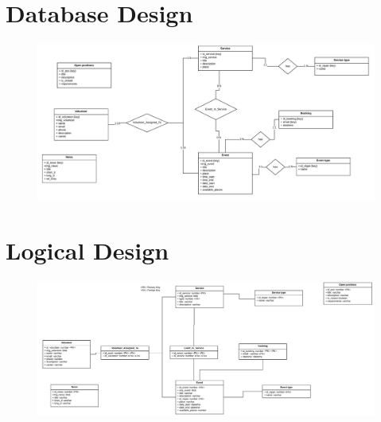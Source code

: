 \section{Database Design}
\begin{figure}[H]
    \centering
    \includegraphics[scale=0.40]{resources/images/db.png}
\end{figure}
\section{Logical Design}
\begin{figure}[H]
    \centering
    \includegraphics[scale=0.40]{resources/images/logical.png}
\end{figure}